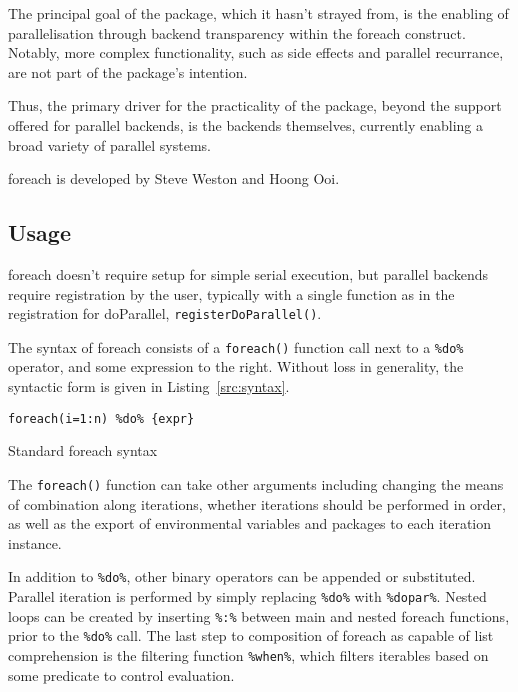 \documentclass[a4paper,10pt]{article}
\begin{document}
The principal goal of the package, which it hasn't strayed from, is
the enabling of parallelisation through backend transparency within
the foreach construct. Notably, more complex functionality, such as
side effects and parallel recurrance, are not part of the package's
intention.

Thus, the primary driver for the practicality of the package, beyond
the support offered for parallel backends, is the backends themselves,
currently enabling a broad variety of parallel systems.

foreach is developed by Steve Weston and Hoong Ooi.

\subsection{Usage}
\label{sec:usage}

foreach doesn't require setup for simple serial execution, but
parallel backends require registration by the user, typically with a
single function as in the registration for doParallel,
\texttt{registerDoParallel()}.

The syntax of foreach consists of a \texttt{foreach()} function call
next to a \texttt{\%do\%} operator, and some expression to the
right\cite{weston19:_using}. Without loss in generality, the syntactic
form is given in Listing~\ref{src:syntax}.

\begin{listing}
\begin{verbatim}
foreach(i=1:n) %do% {expr}
\end{verbatim}
\caption{Standard foreach syntax}\label{src:syntax}
\end{listing}

The \texttt{foreach()} function can take other arguments including
changing the means of combination along iterations, whether iterations
should be performed in order, as well as the export of environmental
variables and packages to each iteration instance.

In addition to \texttt{\%do\%}, other binary operators can be appended
or substituted. Parallel iteration is performed by simply replacing
\texttt{\%do\%} with \texttt{\%dopar\%}. Nested loops can be created
by inserting \texttt{\%:\%} between main and nested foreach functions,
prior to the \texttt{\%do\%} call\cite{weston19:_nestin_loops}. The
last step to composition of foreach as capable of list comprehension
is the filtering function \texttt{\%when\%}, which filters iterables
based on some predicate to control evaluation.
\end{document}
